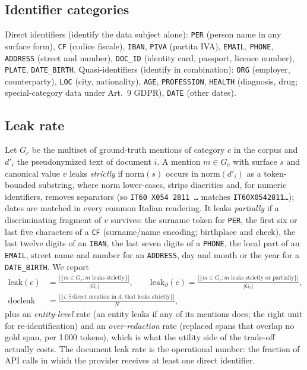 \documentclass[11pt,a4paper]{article}
\newcommand{\pseud}[1]{\texttt{#1}}
\newcommand{\dprime}{d'}
\begin{document}
\subsection{Identifier categories}
Direct identifiers (identify the data subject alone): \pseud{PER} (person name in any surface form), \pseud{CF} (codice fiscale), \pseud{IBAN}, \pseud{PIVA} (partita IVA), \pseud{EMAIL}, \pseud{PHONE}, \pseud{ADDRESS} (street and number), \pseud{DOC\_ID} (identity card, passport, licence number), \pseud{PLATE}, \pseud{DATE\_BIRTH}. Quasi-identifiers (identify in combination): \pseud{ORG} (employer, counterparty), \pseud{LOC} (city, nationality), \pseud{AGE}, \pseud{PROFESSION}, \pseud{HEALTH} (diagnosis, drug; special-category data under Art.~9 GDPR), \pseud{DATE} (other dates).

\subsection{Leak rate}
\label{sec:leak}
Let $G_c$ be the multiset of ground-truth mentions of category $c$ in the corpus and $\dprime_i$ the pseudonymized text of document $i$. A mention $m\in G_c$ with surface $s$ and canonical value $v$ leaks \emph{strictly} if $\mathrm{norm}(s)$ occurs in $\mathrm{norm}(\dprime_i)$ as a token-bounded substring, where $\mathrm{norm}$ lower-cases, strips diacritics and, for numeric identifiers, removes separators (so \pseud{IT60 X054 2811 \ldots} matches \pseud{IT60X0542811\ldots}); dates are matched in every common Italian rendering. It leaks \emph{partially} if a discriminating fragment of $v$ survives: the surname token for \pseud{PER}, the first six or last five characters of a \pseud{CF} (surname/name encoding; birthplace and check), the last twelve digits of an \pseud{IBAN}, the last seven digits of a \pseud{PHONE}, the local part of an \pseud{EMAIL}, street name and number for an \pseud{ADDRESS}, day and month or the year for a \pseud{DATE\_BIRTH}. We report
\begin{align*}
\mathrm{leak}(c) &= \frac{|\{m\in G_c : m \text{ leaks strictly}\}|}{|G_c|}, \qquad
\mathrm{leak}_{\partial}(c) = \frac{|\{m\in G_c : m \text{ leaks strictly or partially}\}|}{|G_c|},\\
\mathrm{docleak} &= \frac{|\{i : \exists\, \text{direct mention in } d_i \text{ that leaks strictly}\}|}{N},
\end{align*}
plus an \emph{entity-level} rate (an entity leaks if any of its mentions does; the right unit for re-identification) and an \emph{over-redaction} rate (replaced spans that overlap no gold span, per 1\,000 tokens), which is what the utility side of the trade-off actually costs. The document leak rate is the operational number: the fraction of API calls in which the provider receives at least one direct identifier.
\end{document}
